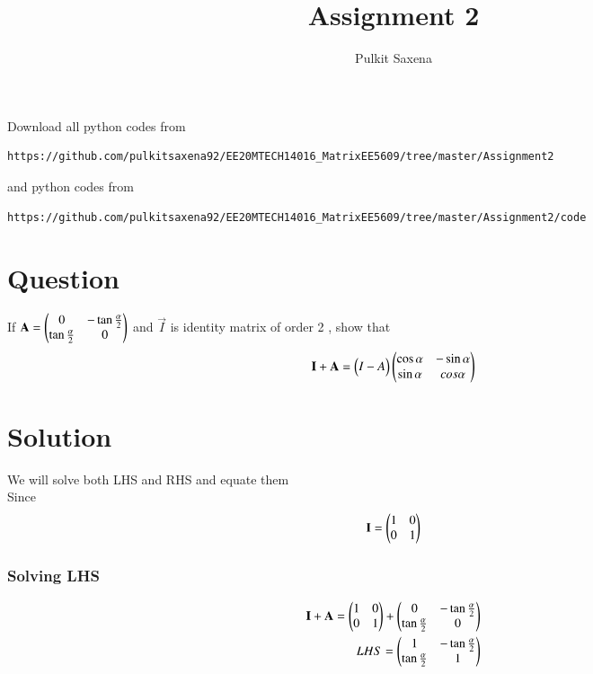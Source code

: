 \documentclass[journal,12pt,onecolumn]{IEEEtran}
\begin{document}
     \def\rightbox#1{\makebox[0in][r]{#1}}
     \def\centbox#1{\makebox[0in]{#1}}
     \def\topbox#1{\raisebox{-\baselineskip}[0in][0in]{#1}}
     \def\midbox#1{\raisebox{-0.5\baselineskip}[0in][0in]{#1}}
\vspace{3cm}
\title{Assignment 2}
\author{Pulkit Saxena}
\maketitle
\bigskip
\renewcommand{\thefigure}{1}
\renewcommand{\thetable}{\theenumi}
Download all python codes from 
\begin{lstlisting}
https://github.com/pulkitsaxena92/EE20MTECH14016_MatrixEE5609/tree/master/Assignment2
\end{lstlisting}
%
and python codes from 
%
\begin{lstlisting}
https://github.com/pulkitsaxena92/EE20MTECH14016_MatrixEE5609/tree/master/Assignment2/code
\end{lstlisting}
\section{\textbf{Question}}
If $\mathbf{A}=\begin{pmatrix}0 & -\tan\frac{\alpha}{2} \\ \tan\frac{\alpha}{2} & 0 \end{pmatrix}$ and $\vec{I}$ is identity matrix of order 2 , show that
\begin{align}
  \mathbf{I}+\mathbf{A}=\begin{pmatrix}I-A\end{pmatrix}\begin{pmatrix}\cos\alpha & -\sin\alpha \\ \sin\alpha & cos\alpha\end{pmatrix}
\end{align}

\section{\textbf{Solution}}
We will solve both LHS and RHS and equate them\\
Since 
\begin{align}
    \mathbf{I}=\begin{pmatrix}1 & 0\\ 0 & 1\end{pmatrix}
\end{align}

\subsubsection{Solving LHS}
\begin{align}
 \Vec{I}+\Vec{A}=\myvec{1 & 0\\ 0 & 1}+\myvec{0 & - \tan\frac{\alpha}{2} \\ \tan\frac{\alpha}{2} & 0 }\\
 LHS=\myvec{1 & - \tan\frac{\alpha}{2} \\ \tan\frac{\alpha}{2} & 1 }
\end{align}
\end{document}
